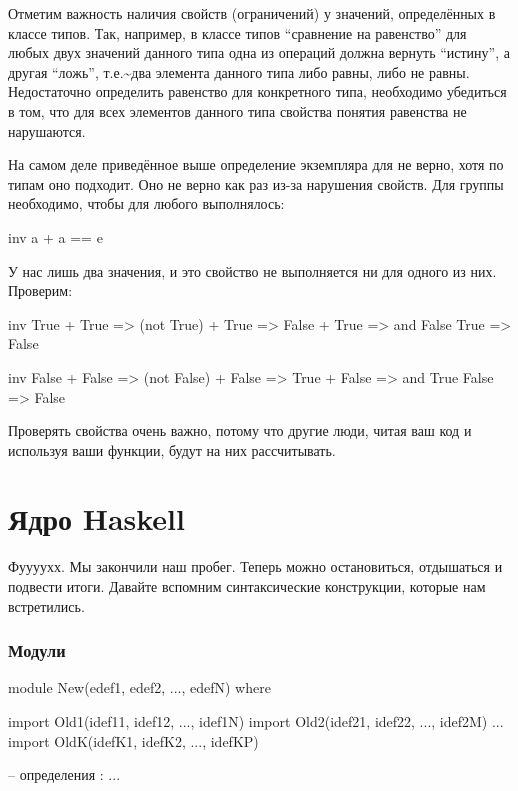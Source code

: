 Отметим важность наличия свойств (ограничений) у значений, определённых
в классе типов. Так, например, в классе типов ``сравнение на равенство''
для любых двух значений данного типа одна из операций должна вернуть
``истину'', а другая ``ложь'', т.е.\textasciitilde{}два элемента данного
типа либо равны, либо не равны. Недостаточно определить равенство для
конкретного типа, необходимо убедиться в том, что для всех элементов
данного типа свойства понятия равенства не нарушаются.

На самом деле приведённое выше определение экземпляра для  не
верно, хотя по типам оно подходит. Оно не верно как раз из-за нарушения
свойств. Для группы необходимо, чтобы для любого  выполнялось:


\begin{code}
 inv a + a == e
\end{code}

У нас лишь два значения, и это свойство не выполняется ни для одного из
них. Проверим:


\begin{code}
    inv True   + True
 => (not True) + True
 => False      + True
 => and False    True
 => False

    inv False   + False
 => (not False) + False
 => True        + False
 => and True      False
 => False
\end{code}

Проверять свойства очень важно, потому что другие люди, читая ваш код и
используя ваши функции, будут на них рассчитывать.

\section{Ядро Haskell}

Фуууухх. Мы закончили наш пробег. Теперь можно остановиться, отдышаться
и подвести итоги. Давайте вспомним синтаксические конструкции, которые
нам встретились.

\subsubsection{Модули}


\begin{code}
module New(edef1, edef2, ..., edefN) where

import Old1(idef11, idef12, ..., idef1N)
import Old2(idef21, idef22, ..., idef2M)
...
import OldK(idefK1, idefK2, ..., idefKP)

-- определения :
...
\end{code}

